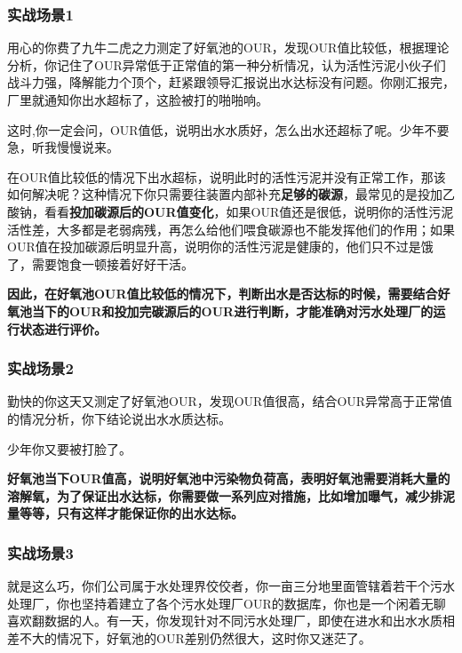 \documentclass[]{book}
\begin{document}
\hypertarget{ux5b9eux6218ux573aux666f1}{%
\subsubsection{实战场景1}\label{ux5b9eux6218ux573aux666f1}}

用心的你费了九牛二虎之力测定了好氧池的OUR，发现OUR值比较低，根据理论分析，你记住了OUR异常低于正常值的第一种分析情况，认为活性污泥小伙子们战斗力强，降解能力个顶个，赶紧跟领导汇报说出水达标没有问题。你刚汇报完，厂里就通知你出水超标了，这脸被打的啪啪响。

这时,你一定会问，OUR值低，说明出水水质好，怎么出水还超标了呢。少年不要急，听我慢慢说来。

在OUR值比较低的情况下出水超标，说明此时的活性污泥并没有正常工作，那该如何解决呢？这种情况下你只需要往装置内部补充\textbf{足够的碳源}，最常见的是投加乙酸钠，看看\textbf{投加碳源后的OUR值变化}，如果OUR值还是很低，说明你的活性污泥活性差，大多都是老弱病残，再怎么给他们喂食碳源也不能发挥他们的作用；如果OUR值在投加碳源后明显升高，说明你的活性污泥是健康的，他们只不过是饿了，需要饱食一顿接着好好干活。

\textbf{因此，在好氧池OUR值比较低的情况下，判断出水是否达标的时候，需要结合好氧池当下的OUR和投加完碳源后的OUR进行判断，才能准确对污水处理厂的运行状态进行评价。}

\hypertarget{ux5b9eux6218ux573aux666f2}{%
\subsubsection{实战场景2}\label{ux5b9eux6218ux573aux666f2}}

勤快的你这天又测定了好氧池OUR，发现OUR值很高，结合OUR异常高于正常值的情况分析，你下结论说出水水质达标。

少年你又要被打脸了。

\textbf{好氧池当下OUR值高，说明好氧池中污染物负荷高，表明好氧池需要消耗大量的溶解氧，为了保证出水达标，你需要做一系列应对措施，比如增加曝气，减少排泥量等等，只有这样才能保证你的出水达标。}

\hypertarget{ux5b9eux6218ux573aux666f3}{%
\subsubsection{实战场景3}\label{ux5b9eux6218ux573aux666f3}}

就是这么巧，你们公司属于水处理界佼佼者，你一亩三分地里面管辖着若干个污水处理厂，你也坚持着建立了各个污水处理厂OUR的数据库，你也是一个闲着无聊喜欢翻数据的人。有一天，你发现针对不同污水处理厂，即使在进水和出水水质相差不大的情况下，好氧池的OUR差别仍然很大，这时你又迷茫了。
\end{document}

